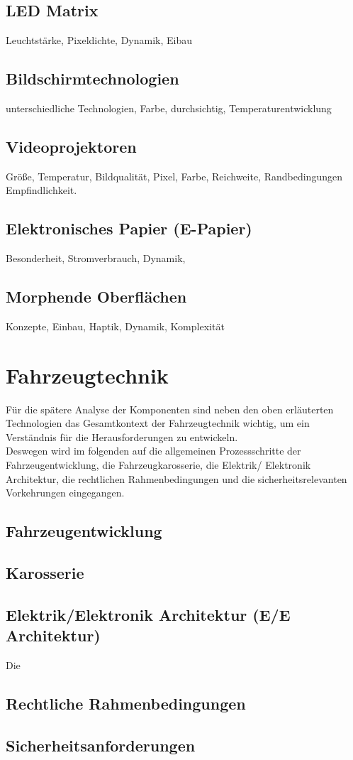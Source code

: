 \subsection{LED Matrix}
Leuchtstärke, Pixeldichte, Dynamik, Eibau
\subsection{Bildschirmtechnologien}
unterschiedliche Technologien, Farbe, durchsichtig, Temperaturentwicklung
\subsection{Videoprojektoren}
Größe, Temperatur, Bildqualität, Pixel, Farbe, Reichweite, Randbedingungen Empfindlichkeit.
\subsection{Elektronisches Papier (E-Papier)}
Besonderheit, Stromverbrauch, Dynamik,
\subsection{Morphende Oberflächen}
Konzepte, Einbau, Haptik, Dynamik, Komplexität

\section{Fahrzeugtechnik}
Für die spätere Analyse der Komponenten sind neben den oben erläuterten Technologien das Gesamtkontext der Fahrzeugtechnik wichtig, um ein Verständnis für die Herausforderungen zu entwickeln.\\
Deswegen wird im folgenden auf die allgemeinen Prozessschritte der Fahrzeugentwicklung, die Fahrzeugkarosserie, die Elektrik/ Elektronik Architektur, die rechtlichen Rahmenbedingungen und die sicherheitsrelevanten Vorkehrungen eingegangen.
\subsection{Fahrzeugentwicklung}
\subsection{Karosserie}
\subsection{Elektrik/Elektronik Architektur (E/E Architektur)}
Die


\subsection{Rechtliche Rahmenbedingungen}

\subsection{Sicherheitsanforderungen}